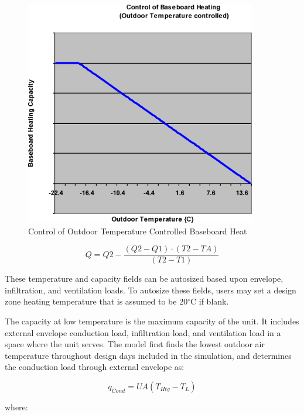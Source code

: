 \begin{figure}[hbtp] %
\centering
\includegraphics[width=0.9\textwidth, height=0.9\textheight, keepaspectratio=true]{media/image5821.png}
\caption{Control of Outdoor Temperature Controlled Baseboard Heat \protect \label{fig:control-of-outdoor-temperature-controlled}}
\end{figure}

\begin{equation}
Q = Q2 - \frac{{(Q2 - Q1)\cdot (T2 - TA)}}{{(T2 - T1)}}
\end{equation}

These temperature and capacity fields can be autosized based upon envelope, infiltration, and ventilation loads. To autosize these fields, users may set a design zone heating temperature that is assumed to be 20$^\circ$C if blank.

The capacity at low temperature is the maximum capacity of the unit. It includes external envelope conduction load, infiltration load, and ventilation load in a space where the unit serves. The model first finds the lowest outdoor air temperature throughout design days included in the simulation, and determines the conduction load through external envelope as:

\begin{equation}
{q_{Cond}} = UA\left( {{T_{Htg}} - {T_L}} \right)
\end{equation}

where:

